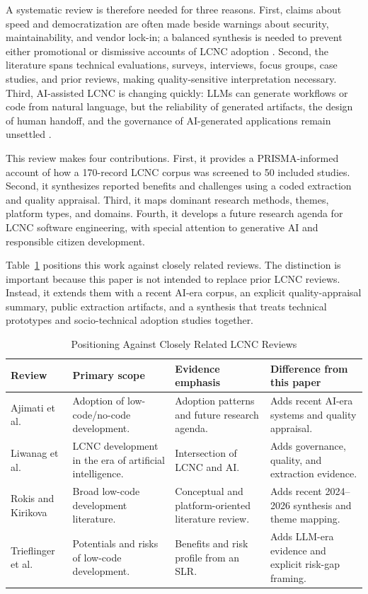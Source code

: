 \documentclass[conference]{IEEEtran}
\begin{document}
A systematic review is therefore needed for three reasons. First, claims about speed and democratization are often made beside warnings about security, maintainability, and vendor lock-in; a balanced synthesis is needed to prevent either promotional or dismissive accounts of LCNC adoption \cite{p15,p18,p26,p30,p34}. Second, the literature spans technical evaluations, surveys, interviews, focus groups, case studies, and prior reviews, making quality-sensitive interpretation necessary. Third, AI-assisted LCNC is changing quickly: LLMs can generate workflows or code from natural language, but the reliability of generated artifacts, the design of human handoff, and the governance of AI-generated applications remain unsettled \cite{p04,p05,p07,p08,p31,p41,p42}.

This review makes four contributions. First, it provides a PRISMA-informed account of how a 170-record LCNC corpus was screened to 50 included studies. Second, it synthesizes reported benefits and challenges using a coded extraction and quality appraisal. Third, it maps dominant research methods, themes, platform types, and domains. Fourth, it develops a future research agenda for LCNC software engineering, with special attention to generative AI and responsible citizen development.

Table~\ref{tab:related} positions this work against closely related reviews. The distinction is important because this paper is not intended to replace prior LCNC reviews. Instead, it extends them with a recent AI-era corpus, an explicit quality-appraisal summary, public extraction artifacts, and a synthesis that treats technical prototypes and socio-technical adoption studies together.

\begin{table}[t]
\centering
\caption{Positioning Against Closely Related LCNC Reviews}
\label{tab:related}
\scriptsize
\begin{tabularx}{\textwidth}{p{} p{} p{} p{}}
\toprule
Review & Primary scope & Evidence emphasis & Difference from this paper \\
\midrule
Ajimati et al. \cite{p18} & Adoption of low-code/no-code development. & Adoption patterns and future research agenda. & Adds recent AI-era systems and quality appraisal. \\
Liwanag et al. \cite{p11} & LCNC development in the era of artificial intelligence. & Intersection of LCNC and AI. & Adds governance, quality, and extraction evidence. \\
Rokis and Kirikova \cite{p29} & Broad low-code development literature. & Conceptual and platform-oriented literature review. & Adds recent 2024--2026 synthesis and theme mapping. \\
Trieflinger et al. \cite{p15} & Potentials and risks of low-code development. & Benefits and risk profile from an SLR. & Adds LLM-era evidence and explicit risk-gap framing. \\
\bottomrule
\end{tabularx}
\end{table}
\end{document}
